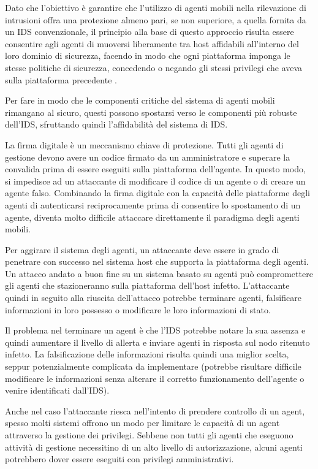 Dato che l'obiettivo è garantire che l'utilizzo di agenti mobili nella rilevazione di intrusioni offra una protezione almeno pari, se non superiore, a quella fornita da un IDS convenzionale, il principio alla base di questo approccio risulta essere consentire agli agenti di muoversi liberamente tra host affidabili all'interno del loro dominio di sicurezza, facendo in modo che ogni piattaforma imponga le stesse politiche di sicurezza, concedendo o negando gli stessi privilegi che aveva sulla piattaforma precedente \cite{jansen2002intrusion}.

Per fare in modo che le componenti critiche del sistema di agenti mobili rimangano al sicuro, questi possono spostarsi verso le componenti più robuste dell'IDS, sfruttando quindi l'affidabilità del sistema di IDS.

\smallskip

La firma digitale è un meccanismo chiave di protezione. Tutti gli agenti di gestione devono avere un codice firmato da un amministratore e superare la convalida prima di essere eseguiti sulla piattaforma dell'agente. In questo modo, si impedisce ad un attaccante di modificare il codice di un agente o di creare un agente falso. Combinando la firma digitale con la capacità delle piattaforme degli agenti di autenticarsi reciprocamente prima di consentire lo spostamento di un agente, diventa molto difficile attaccare direttamente il paradigma degli agenti mobili.

\smallskip

Per aggirare il sistema degli agenti, un attaccante deve essere in grado di penetrare con successo nel sistema host che supporta la piattaforma degli agenti. Un attacco andato a buon fine su un sistema basato su agenti può compromettere gli agenti che stazioneranno sulla piattaforma dell'host infetto. L'attaccante quindi in seguito alla riuscita dell'attacco potrebbe terminare agenti, falsificare informazioni in loro possesso o modificare le loro informazioni di stato.


Il problema nel terminare un agent è che l'IDS potrebbe notare la sua assenza e quindi aumentare il livello di allerta e  inviare agenti in risposta sul nodo ritenuto infetto. La falsificazione delle informazioni risulta quindi una miglior scelta, seppur potenzialmente complicata da implementare (potrebbe risultare difficile modificare le informazioni senza alterare il corretto funzionamento dell'agente o venire identificati dall'IDS).

Anche nel caso l'attaccante riesca nell'intento di prendere controllo di un agent, spesso molti sistemi offrono un modo per limitare le capacità di un agent attraverso la gestione dei privilegi. Sebbene non tutti gli agenti che eseguono attività di gestione necessitino di un alto livello di autorizzazione, alcuni agenti potrebbero dover essere eseguiti con privilegi amministrativi.

